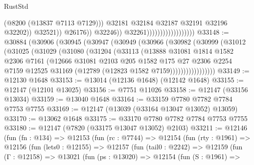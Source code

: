\begin{lexlean}{RustStd}
\begin{coremodule}
                                                          (@8200 (@13837 @7113 @7129)))
                                                        @32181
                                                        @32184
                                                        @32187
                                                        @32191
                                                        @32196
                                                        @32202))
                                                    @32521))
                                                @26176))
                                            @32246))
                                        @32261))))))))))))))))))
@33148 := @30884
    (@30906
      (@30945
        (@30947
          (@30949
            (@30966
              (@30982
                (@30999
                  (@31012
                    (@31025
                      (@31029
                        (@31080
                          (@31204
                            (@33113
                              (@13888
                                @31081
                                @1814
                                @1582
                                @2306
                                @7161
                                (@12666
                                  @31081
                                  @2103
                                  @205
                                  @1582
                                  @175
                                  @27
                                  @2306
                                  @2254
                                  @7159
                                  @12525
                                  @31169
                                  (@12789 (@12823 @1582 @7159)))))))))))))))))
@33149 := @12130 @1648
@33153 := @13014 (@12136 @1648) (@12142 @1648)
@33155 := @12147 (@12101 @13025)
@33156 := @7751 @11026
@33158 := @12147 (@33156 @13034)
@33159 := @13040 @1648
@33164 := @33159 @7780 @7782 @7784 @7753 @7755
@33169 := @12147 (@13039 (@33164 @13047 @13052) @13059)
@33170 := @13062 @1648
@33175 := @33170 @7780 @7782 @7784 @7753 @7755
@33180 := @12147 (@7820 (@33175 @13047 @13052) @2103)
@33211 := @12146
    (fun (fn : @134) =>
    @12153
      (fun (rc : @7744) =>
      @12154
        (fun (rty : @1961) =>
        @12156
          (fun (lets0 : @12155) =>
          @12157
            (fun (tail0 : @2242) =>
            @12159
              (fun (Γ : @12158) =>
              @13021
                (fun (ps : @13020) =>
                @12154
                  (fun (S : @1961) =>

\end{coremodule}
\end{lexlean}
